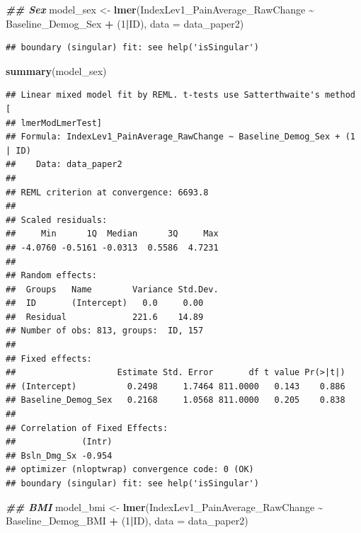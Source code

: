 \documentclass[
  12pt,
]{article}
\newenvironment{Shaded}{\begin{snugshade}}{\end{snugshade}}
\newcommand{\AttributeTok}[1]{\textcolor[rgb]{0.13,0.29,0.53}{#1}}
\newcommand{\DecValTok}[1]{\textcolor[rgb]{0.00,0.00,0.81}{#1}}
\newcommand{\DocumentationTok}[1]{\textcolor[rgb]{0.56,0.35,0.01}{\textbf{\textit{#1}}}}
\newcommand{\FunctionTok}[1]{\textcolor[rgb]{0.13,0.29,0.53}{\textbf{#1}}}
\newcommand{\NormalTok}[1]{#1}
\newcommand{\OtherTok}[1]{\textcolor[rgb]{0.56,0.35,0.01}{#1}}
\newcommand{\SpecialCharTok}[1]{\textcolor[rgb]{0.81,0.36,0.00}{\textbf{#1}}}
\begin{document}
\begin{Shaded}
\begin{Highlighting}[]
\DocumentationTok{\#\# Sex}
\NormalTok{model\_sex }\OtherTok{\textless{}{-}} \FunctionTok{lmer}\NormalTok{(IndexLev1\_PainAverage\_RawChange }\SpecialCharTok{\textasciitilde{}}\NormalTok{ Baseline\_Demog\_Sex }\SpecialCharTok{+}\NormalTok{ (}\DecValTok{1}\SpecialCharTok{|}\NormalTok{ID), }\AttributeTok{data =}\NormalTok{ data\_paper2)}
\end{Highlighting}
\end{Shaded}

\begin{verbatim}
## boundary (singular) fit: see help('isSingular')
\end{verbatim}

\begin{Shaded}
\begin{Highlighting}[]
\FunctionTok{summary}\NormalTok{(model\_sex)}
\end{Highlighting}
\end{Shaded}

\begin{verbatim}
## Linear mixed model fit by REML. t-tests use Satterthwaite's method [
## lmerModLmerTest]
## Formula: IndexLev1_PainAverage_RawChange ~ Baseline_Demog_Sex + (1 | ID)
##    Data: data_paper2
## 
## REML criterion at convergence: 6693.8
## 
## Scaled residuals: 
##     Min      1Q  Median      3Q     Max 
## -4.0760 -0.5161 -0.0313  0.5586  4.7231 
## 
## Random effects:
##  Groups   Name        Variance Std.Dev.
##  ID       (Intercept)   0.0     0.00   
##  Residual             221.6    14.89   
## Number of obs: 813, groups:  ID, 157
## 
## Fixed effects:
##                    Estimate Std. Error       df t value Pr(>|t|)
## (Intercept)          0.2498     1.7464 811.0000   0.143    0.886
## Baseline_Demog_Sex   0.2168     1.0568 811.0000   0.205    0.838
## 
## Correlation of Fixed Effects:
##             (Intr)
## Bsln_Dmg_Sx -0.954
## optimizer (nloptwrap) convergence code: 0 (OK)
## boundary (singular) fit: see help('isSingular')
\end{verbatim}

\begin{Shaded}
\begin{Highlighting}[]
\DocumentationTok{\#\# BMI}
\NormalTok{model\_bmi }\OtherTok{\textless{}{-}} \FunctionTok{lmer}\NormalTok{(IndexLev1\_PainAverage\_RawChange }\SpecialCharTok{\textasciitilde{}}\NormalTok{ Baseline\_Demog\_BMI }\SpecialCharTok{+}\NormalTok{ (}\DecValTok{1}\SpecialCharTok{|}\NormalTok{ID), }\AttributeTok{data =}\NormalTok{ data\_paper2)}
\end{Highlighting}
\end{Shaded}
\end{document}

